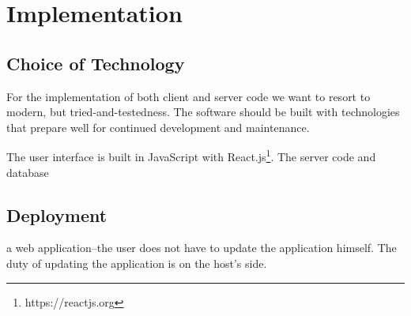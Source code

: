 \section{Implementation}

\subsection{Choice of Technology}

For the implementation of both client and server code we want to resort to modern, but tried-and-testedness.
The software should be built with technologies that prepare well for continued development and maintenance.

The user interface is built in JavaScript with React.js\footnote{https://reactjs.org}. 
The server code and database

\subsection{Deployment}

a web application–the user does not have to update the application himself. 
The duty of updating the application is on the host's side.
